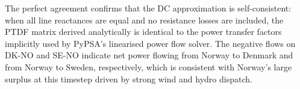 The perfect agreement confirms that the DC approximation is self-consistent: when all line reactances are equal and no resistance losses are included, the PTDF matrix derived analytically is identical to the power transfer factors implicitly used by PyPSA's linearised power flow solver. The negative flows on DK-NO and SE-NO indicate net power flowing from Norway to Denmark and from Norway to Sweden, respectively, which is consistent with Norway's large surplus at this timestep driven by strong wind and hydro dispatch.
